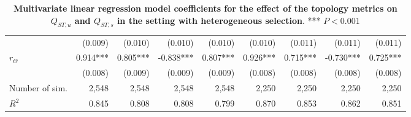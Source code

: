 \begin{table}[ht]
\begin{center}
{\begin{tabular}{|l||r|r|r|r|r|r|r|r|}
                   &                   (0.009) &                  (0.010) &                  (0.010) &                  (0.010)   &   (0.010) &                  (0.011) &                  (0.011) &                  (0.011)\\ 
    $r_\Theta$     &                  0.914*** &                 0.805*** &                -0.838*** &                 0.807***   &  0.926*** &                 0.715*** &                -0.730*** &                 0.725***\\ 
                   &                   (0.008) &                  (0.009) &                  (0.009) &                  (0.009)   &   (0.008) &                  (0.008) &                  (0.008) &                  (0.008)\\ 
    \hline \hline
    Number of sim. &                     2,548 &                    2,548 &                    2,548 &                    2,548   &     2,250 &                    2,250 &                    2,250 &                    2,250\\ 
    $R^2$          &                     0.845 &                    0.808 &                    0.808 &                    0.799   &     0.870 &                    0.853 &                    0.862 &                    0.851\\ 
    \hline 
    \end{tabular}
    }  \end{center}

    \caption{ \textbf{Multivariate linear regression model coefficients for the effect of the topology metrics on $Q_{ST,u}$ and $Q_{ST,s}$ in the setting with heterogeneous selection}. *** $P < 0.001$}
    \label{tableSI:coefficients_set2}
\end{table}



